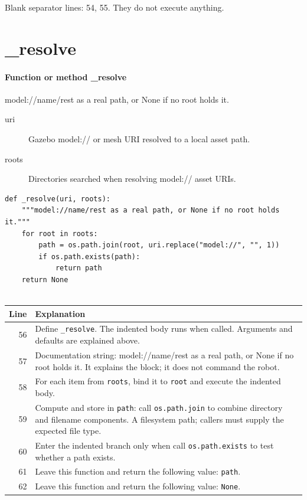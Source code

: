 \documentclass[11pt,a4paper]{book}
\begin{document}
Blank separator lines: 54, 55. They do not execute anything.

\section{\_resolve}

\paragraph{Function or method \_resolve}
model://name/rest as a real path, or None if no root holds it.

\begin{description}
\item[uri] Gazebo model:// or mesh URI resolved to a local asset path.
\item[roots] Directories searched when resolving model:// asset URIs.
\end{description}

\begin{lstlisting}[firstnumber=56]
def _resolve(uri, roots):
    """model://name/rest as a real path, or None if no root holds it."""
    for root in roots:
        path = os.path.join(root, uri.replace("model://", "", 1))
        if os.path.exists(path):
            return path
    return None


\end{lstlisting}

\begin{longtable}{r p{}}

\textbf{Line} & \textbf{Explanation} \\ \hline \endhead

56 & Define \texttt{\_resolve}. The indented body runs when called. Arguments and defaults are explained above. \\

57 & Documentation string: model://name/rest as a real path, or None if no root holds it. It explains the block; it does not command the robot. \\

58 & For each item from \texttt{roots}, bind it to \texttt{root} and execute the indented body. \\

59 & Compute and store in \texttt{path}: call \texttt{os.path.join} to combine directory and filename components. A filesystem path; callers must supply the expected file type. \\

60 & Enter the indented branch only when call \texttt{os.path.exists} to test whether a path exists. \\

61 & Leave this function and return the following value: \texttt{path}. \\

62 & Leave this function and return the following value: \texttt{None}. \\

\end{longtable}
\end{document}
